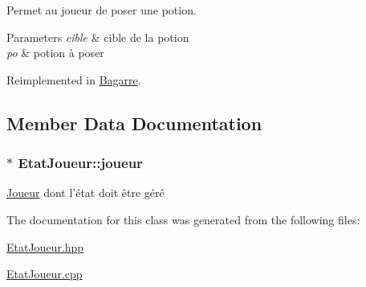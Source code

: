 Permet au joueur de poser une potion. 


\begin{DoxyParams}{Parameters}
{\em cible} & cible de la potion \\
\hline
{\em po} & potion à poser \\
\hline
\end{DoxyParams}


Reimplemented in \hyperlink{class_bagarre_ae0a87f0398857acbabb9993886e96a82}{Bagarre}.



\subsection{Member Data Documentation}
\hypertarget{class_etat_joueur_a268f5c0a90e0501233fad4407508e41b}{
\subsubsection[{joueur}]{$\ast$ Etat\-Joueur\-::joueur\hspace{0.3cm}{\ttfamily [protected]}}}\label{class_etat_joueur_a268f5c0a90e0501233fad4407508e41b}
\hyperlink{class_joueur}{Joueur} dont l'état doit être géré 

The documentation for this class was generated from the following files\-:\begin{DoxyCompactItemize}
\item 
\hyperlink{_etat_joueur_8hpp}{Etat\-Joueur.\-hpp}\item 
\hyperlink{_etat_joueur_8cpp}{Etat\-Joueur.\-cpp}\end{DoxyCompactItemize}
